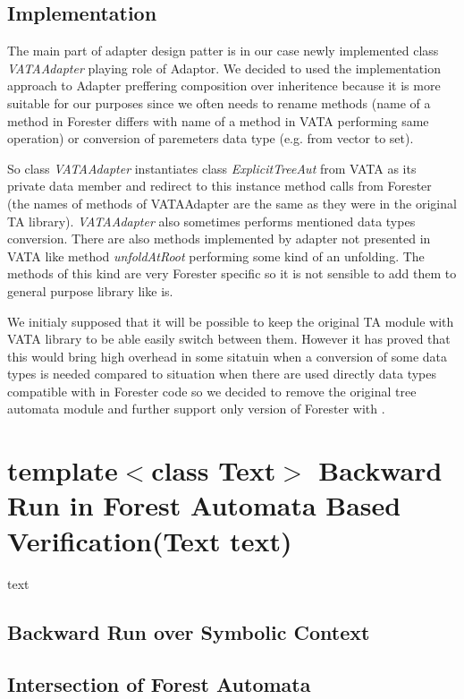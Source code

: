 \section{Implementation}
\label{sec:fova_impl}

The main part of adapter design patter is in our case newly implemented class \emph{VATAAdapter} playing role of Adaptor.
We decided to used the implementation approach to Adapter preffering composition over inheritence
because it is more suitable for our purposes since we often needs to rename methods 
(name of a method in Forester differs with name of a method in VATA performing same operation)
or conversion of paremeters data type (e.g. from vector to set). 

So class \emph{VATAAdapter} instantiates class \emph{ExplicitTreeAut} from VATA as its private data member
and redirect to this instance method calls from Forester (the names of methods of VATAAdapter are the same as they were
in the original TA library).
\emph{VATAAdapter} also sometimes performs mentioned data types conversion.
There are also methods implemented by adapter not presented in VATA like method \emph{unfoldAtRoot}
performing some kind of an unfolding.
The methods of this kind are very Forester specific so it is not sensible to add them to general purpose library like \vata is.

We initialy supposed that it will be possible to keep the original TA module with VATA library
to be able easily switch between them.
However it has proved that this would bring high overhead in some sitatuin when a conversion of some data types is needed
compared to situation when there are used directly data types compatible with \vata in Forester code
so we decided to remove the original tree automata module and further support only version of Forester with \vata.

\chapter{template$<$class Text$>$ Backward Run in Forest Automata Based Verification(Text text)}
\label{ch:backward}
text

\section{Backward Run over Symbolic Context}

\section{Intersection of Forest Automata}

